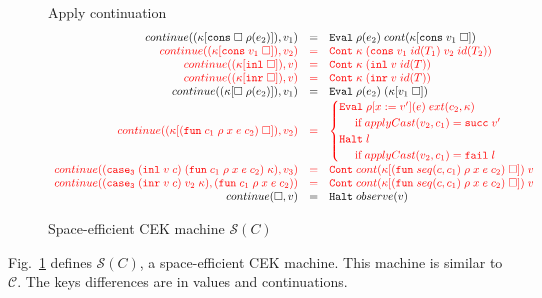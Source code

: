 \documentclass[acmsmall,review,anonymous]{acmart}\settopmatter{printfolios=true,printccs=false,printacmref=false}
\newcommand{\figref}[1]{Fig.~\ref{#1}}
\newcommand{\funrule}[3]{#1 &=& #2 & #3\\}
\newcommand{\hifunrule}[3]{\highlight{#1} &\highlight{=}& \highlight{#2} & 
\highlight{#3}\\}
\newcommand{\sOOinspect}[3]{\mathtt{Eval} \; #2(#1) \; #3}
\newcommand{\sOOreturn}[2]{\mathtt{Cont} \; #2 \; #1}
\newcommand{\sOOhalt}[1]{\mathtt{Halt} \; #1}
\newcommand{\rOOsucc}[1]{\mathtt{succ}\;#1}
\newcommand{\rOOfail}[1]{\mathtt{fail}\;#1}
\newcommand{\kOOmt}[0]{\square}
\newcommand{\kOOconsI}[3]{#3[\mathtt{cons} \; \square \; #2(#1) ]}
\newcommand{\kOOconsII}[2]{#2[\mathtt{cons} \; #1 \; \square]}
\newcommand{\kOOinl}[1]{#1[\mathtt{inl} \; \square]}
\newcommand{\kOOinr}[1]{#1[\mathtt{inr} \; \square]}
\newcommand{\kOOappI}[3]{
	#3[\square \; #2(#1) ]
}
\newcommand{\kOOappII}[2]{
	#2[#1 \; \square]}
\newcommand{\hcvOOfun}[5]{\mathtt{fun} \; #1 \; #2 \; #3 \; #4 \; #5}
\newcommand{\hcvOOcons}[4]{\mathtt{cons}\;#1\;#2\;#3\;#4}
\newcommand{\hcvOOinl}[2]{\mathtt{inl}\;#1\;#2}
\newcommand{\hcvOOinr}[2]{\mathtt{inr}\;#1\;#2}
\newcommand{\hckOOmt}[0]{\mathtt{stop}}
\newcommand{\sidecond}[1]{\text{if}\;#1}
\newcommand{\judgeSreduceTrans}[3]{#2 \longmapsto_{\mathcal{S}(#1)}^{*} #3}
\newcommand{\judgeSeval}[3]{eval_{\mathcal{S}(#1)}(#2) = #3}
\newcommand{\ineffCEK}{$ \mathcal{C} $}
\newcommand{\effCEK}[1]{$ \mathcal{S}(#1) $}
\newcommand{\continue}[2]{continue(#2,#1)}
\newcommand{\highlight}[1]{{\color{red} #1}}
\begin{document}
\begin{figure}
	Apply continuation
	\[
	\begin{array}{rclr}
	

\funrule{
	\continue{v_1}{(\kOOconsI{e_2}{\rho}{\kappa})}}{
	\sOOinspect{e_2}{\rho}{cont(\kOOconsII{v_1}{\kappa})}}{}

\hifunrule{
	\continue{v_2}{(\kOOconsII{v_1}{\kappa})}}{
	\sOOreturn{(\hcvOOcons{v_1}{id(T_1)}{v_2}{id(T_2)})}{\kappa}}{}

\hifunrule{
	\continue{v}{(\kOOinl{\kappa})}}{
	\sOOreturn{(\hcvOOinl{v}{id(T)})}{\kappa}}{}

\hifunrule{
	\continue{v}{(\kOOinr{\kappa})}}{
	\sOOreturn{(\hcvOOinr{v}{id(T)})}{\kappa}}{}

\funrule{
	\continue{v_1}{(\kOOappI{e_2}{\rho}{\kappa})}}{
	\sOOinspect{e_2}{\rho}{(\kOOappII{v_1}{\kappa})}}{}


\hifunrule{
	\continue{v_2}{(\kOOappII{(\hcvOOfun{c_1}{\rho}{x}{e}{c_2})}{\kappa})}}{
\begin{cases}
	\sOOinspect{e}{\rho[x:=v']}{ext(c_2,\kappa)} \\
\;\;\;\;\;\sidecond{applyCast(v_2,c_1) = \rOOsucc{v'}}
\\
\sOOhalt{l} \\
\;\;\;\;\;\sidecond{applyCast(v_2,c_1) = \rOOfail{l}}
\end{cases}
}{}
\hifunrule{
	\continue{v_3}{(\mathtt{case_3}\;(\hcvOOinl{v}{c})\;
		(\hcvOOfun{c_1}{\rho}{x}{e}{c_2})
		\;\kappa)}
}{
	\sOOreturn{v}{cont(\kOOappII{(\hcvOOfun{seq(c,c_1)}{\rho}{x}{e}{c_2})}{\kappa})}
}{}

\hifunrule{
	\continue{(\hcvOOfun{c_1}{\rho}{x}{e}{c_2})}
	{(\mathtt{case_3}\;(\hcvOOinr{v}{c})\;v_2\;\kappa)}
}{
	\sOOreturn{v}{cont(\kOOappII{(\hcvOOfun{seq(c,c_1)}{\rho}{x}{e}{c_2})}{\kappa})}
}{}

\funrule{
	\continue{v}{\kOOmt}}{
	\sOOhalt{observe(v)}}{}
	
	\end{array}\]
	
	
	
	\caption{Space-efficient CEK machine $ \mathcal{S}(C) $}
	\label{fig:machine-cekcc}
\end{figure}
\figref{fig:machine-cekcc} defines \effCEK{C}, a space-efficient
CEK machine.  This machine is similar to \ineffCEK{}.
The keys differences are in values and continuations.
\end{document}
